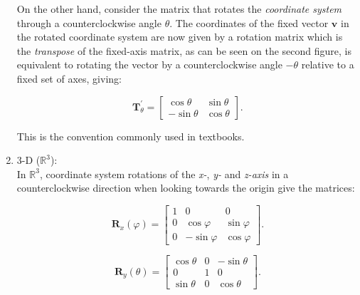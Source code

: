 \documentclass[10pt,b5paper,titlepage]{book}
\begin{document}
\begin{enumerate}
        On the other hand, consider the matrix that rotates the
        \textit{coordinate system} through a counterclockwise angle $\theta$.
        The coordinates of the fixed vector $\mathbf{v}$ in the rotated
        coordinate system are now given by a rotation matrix which is the
        \textit{transpose} of the fixed-axis matrix, as can be seen on the
        second figure, is equivalent to rotating the vector by
        a counterclockwise angle $-\theta$ relative to a fixed set of axes,
        giving:

        \begin{equation}
            \mathbf{T}_{\theta}^{'} = \begin{bmatrix}
                \cos \theta & \sin \theta \\
                -\sin \theta & \cos \theta
            \end{bmatrix}
        .\end{equation}

        This is the convention commonly used in textbooks.

    \item 3-D ($\mathbb{R}^{3}$):\\

        In $\mathbb{R}^{3}$, coordinate system rotations of the
        \textit{x-}, \textit{y-} and \textit{z-axis} in a counterclockwise
        direction when looking towards the origin give the matrices:

        \begin{equation}
            \mathbf{R}_{x}(\varphi) =
            \begin{bmatrix}
                1 & 0 & 0 \\
                0 & \cos \varphi & \sin \varphi \\
                0 & -\sin \varphi & \cos \varphi
            \end{bmatrix}
        .\end{equation}

        \begin{equation}
            \mathbf{R}_{y}(\theta) =
            \begin{bmatrix}
                \cos \theta & 0 & -\sin \theta \\
                0 & 1 & 0 \\
                \sin \theta & 0 & \cos \theta
            \end{bmatrix}
        .\end{equation}


\end{enumerate}
\end{document}
